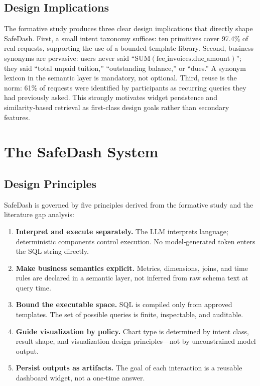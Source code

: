 \documentclass[11pt]{article}
\begin{document}
\subsection{Design Implications}
The formative study produces three clear design implications that directly shape SafeDash. First, a small intent taxonomy suffices: ten primitives cover 97.4\% of real requests, supporting the use of a bounded template library. Second, business synonyms are pervasive: users never said ``$\mathrm{SUM}(\mathrm{fee\_invoices.due\_amount})$''; they said ``total unpaid tuition,'' ``outstanding balance,'' or ``dues.'' A synonym lexicon in the semantic layer is mandatory, not optional. Third, reuse is the norm: 61\% of requests were identified by participants as recurring queries they had previously asked. This strongly motivates widget persistence and similarity‑based retrieval as first‑class design goals rather than secondary features.

\section{The SafeDash System}
\subsection{Design Principles}
SafeDash is governed by five principles derived from the formative study and the literature gap analysis:
\begin{enumerate}
  \item \textbf{Interpret and execute separately.} The LLM interprets language; deterministic components control execution. No model‑generated token enters the SQL string directly.
  \item \textbf{Make business semantics explicit.} Metrics, dimensions, joins, and time rules are declared in a semantic layer, not inferred from raw schema text at query time.
  \item \textbf{Bound the executable space.} SQL is compiled only from approved templates. The set of possible queries is finite, inspectable, and auditable.
  \item \textbf{Guide visualization by policy.} Chart type is determined by intent class, result shape, and visualization design principles—not by unconstrained model output.
  \item \textbf{Persist outputs as artifacts.} The goal of each interaction is a reusable dashboard widget, not a one‑time answer.
\end{enumerate}
\end{document}
